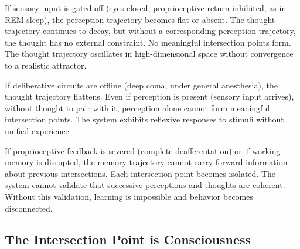 \begin{proposition}
If sensory input is gated off (eyes closed, proprioceptive return inhibited, as in REM sleep), the perception trajectory becomes flat or absent. The thought trajectory continues to decay, but without a corresponding perception trajectory, the thought has no external constraint. No meaningful intersection points form. The thought trajectory oscillates in high-dimensional space without convergence to a realistic attractor.
\end{proposition}

\begin{proposition}
If deliberative circuits are offline (deep coma, under general anesthesia), the thought trajectory flattens. Even if perception is present (sensory input arrives), without thought to pair with it, perception alone cannot form meaningful intersection points. The system exhibits reflexive responses to stimuli without unified experience.
\end{proposition}

\begin{proposition}
If proprioceptive feedback is severed (complete deafferentation) or if working memory is disrupted, the memory trajectory cannot carry forward information about previous intersections. Each intersection point becomes isolated. The system cannot validate that successive perceptions and thoughts are coherent. Without this validation, learning is impossible and behavior becomes disconnected.
\end{proposition}

\subsection{The Intersection Point is Consciousness}

